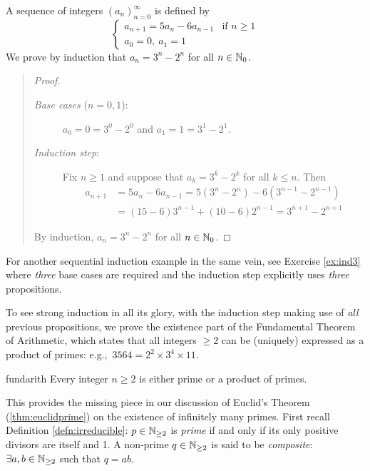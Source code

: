\begin{example}{}{}
	A sequence of integers $(a_n)_{n=0}^\infty$ is defined by
	\[
		\begin{cases}
			a_{n+1}=5a_n-6a_{n-1}&\text{if }n\ge 1\\
			a_0=0,\ a_1=1
		\end{cases}
	\]
	We prove by induction that $a_n=3^n-2^n$ for all $n\in\mathbb{N}_0$.
	
	\begin{quote}
		\begin{proof}
			\begin{description}
				\item[\normalfont\emph{Base cases} ($n=0,1$):] $a_0=0=3^0-2^0$ and $a_1=1=3^1-2^1$.
				\item[\normalfont\emph{Induction step}:] Fix $n\ge 1$ and suppose that $a_k=3^k-2^k$ for all $k\le n$. Then
				\begin{align*}
					a_{n+1}
					&=5a_n-6a_{n-1}
						=5(3^n-2^n)-6(3^{n-1}-2^{n-1})\\
					&=(15-6)3^{n-1}+(10-6)2^{n-1}
						=3^{n+1}-2^{n+1}
				\end{align*}
			\end{description} 
			By induction, $a_n=3^n-2^n$ for all $n\in\mathbb{N}_0$.
		\end{proof}
	\end{quote}
\end{example}

\goodbreak


For another sequential induction example in the same vein, see Exercise \ref{ex:ind3} where \emph{three} base cases are required and the induction step explicitly uses \emph{three} propositions.\bigbreak

To see strong induction in all its glory, with the induction step making use of \emph{all} previous propositions, we prove the existence part of the Fundamental Theorem of Arithmetic, which states that all integers $\ge 2$ can be (uniquely) expressed as a product of primes: e.g.,\ $3564=2^2\times 3^4\times 11$. 


\begin{thm}{}{fundarith}
	Every integer $n\ge 2$ is either prime or a product of primes.
\end{thm}

This provides the missing piece in our discussion of Euclid's Theorem (\ref{thm:euclidprime}) on the existence of infinitely many primes. First recall Definition \ref{defn:irreducible}: $p\in\mathbb{N}_{\ge 2}$ is \emph{prime} if and only if its only positive divisors are itself and 1. A non-prime $q\in\mathbb{N}_{\ge 2}$ is said to be \emph{composite}: $\exists a,b\in\mathbb{N}_{\ge 2}$ such that $q=ab$.


